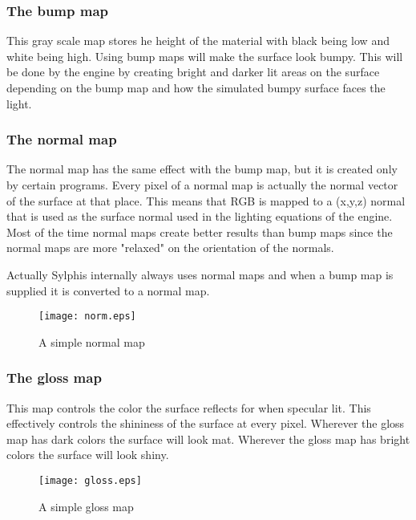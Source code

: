 \documentclass[12pt, titlepage]{amsart}
\begin{document}
\subsubsection{The bump map}
This gray scale map stores he height of the material with black being low and white being high.
Using bump maps will make the surface look bumpy. This will be done by the engine by creating
bright and darker lit areas on the surface depending on the bump map and how the simulated
bumpy surface faces the light.

\subsubsection{The normal map}
The normal map has the same effect with the bump map, but it is created only by
certain programs. Every pixel of a normal map is actually the normal vector of the
surface at that place. This means that RGB is mapped to a (x,y,z) normal that is
used as the surface normal used in the lighting equations of the engine.
Most of the time normal maps create better results than bump maps since the
normal maps are more "relaxed" on the orientation of the normals.

Actually Sylphis internally always uses normal maps and when a bump map is supplied
it is converted to a normal map.

\begin{figure}
\begin{center}
\texttt{[image: norm.eps]} \\
\end{center}
\caption{A simple normal map}
\label{figure:normalmap}
\end{figure}

\subsubsection{The gloss map}
This map controls the color the surface reflects for when specular lit. This effectively
controls the shininess of the surface at every pixel. Wherever the gloss map has dark
colors the surface will look mat. Wherever the gloss map has bright colors the surface
will look shiny.

\begin{figure}
\begin{center}
\texttt{[image: gloss.eps]} \\
\end{center}
\caption{A simple gloss map}
\label{figure:glossmap}
\end{figure}
\end{document}
